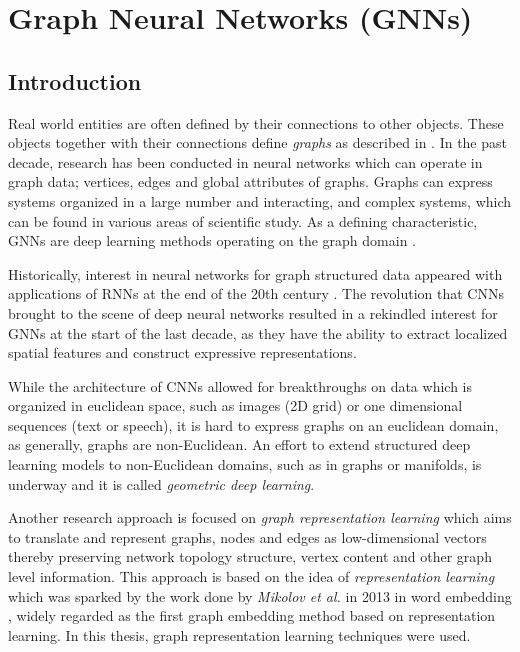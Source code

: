 \chapter{Graph Neural Networks (GNNs)} \label{GNN}

\section{Introduction}

Real world entities are often defined by their connections to other
objects. These objects together with their connections define
\textit{graphs} as described in . In the past decade,
research has been conducted in neural networks \cite{article:TGNNM}
which can operate in graph data; vertices, edges and global attributes
of graphs. Graphs can express systems organized in a large number and
interacting, and complex systems, which can be found in various areas
of scientific study. As a defining characteristic, GNNs are deep
learning methods operating on the graph domain \cite{article:zhou}.

Historically, interest in neural networks for graph structured data
appeared with applications of RNNs at the end of the 20th century
\cite{article:sperduti}. The revolution that CNNs brought to the
scene of deep neural networks resulted in a rekindled interest for
GNNs at the start of the last decade, as they have the ability to
extract localized spatial features and construct expressive representations.

While the architecture of CNNs allowed for breakthroughs on data which
is organized in euclidean space, such as images (2D grid) or
one dimensional sequences (text or speech), it is hard to express
graphs on an euclidean domain, as generally, graphs are non-Euclidean.
An effort to extend structured deep learning models to non-Euclidean
domains, such as in graphs or manifolds, is underway and it is called
\textit{geometric deep learning}\cite{article:geomDeep}. 

Another research approach is focused on \textit{graph representation
  learning} \cite{hamilton2017representation, article:zhang} which aims
to translate and represent graphs, nodes and edges as low-dimensional
vectors thereby preserving network topology structure, vertex content
and other graph level information. This approach is based on the idea
of \textit{representation learning} which was sparked by the work done
by \textit{Mikolov et al.} in 2013 in word embedding
\cite{mikolov2013efficient,mikolov2013distributed}, widely regarded
as the first graph embedding method based on representation learning.
In this thesis, graph representation learning techniques
were used.

